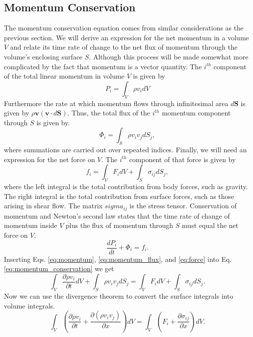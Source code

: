 \documentclass[12pt, letter]{report}
\begin{document}
\subsection{Momentum Conservation}
The momentum conservation equation comes from similar considerations as the previous section. We will derive an expression for the net momentum in a volume $V$ and relate its time rate of change to the net flux of momentum through the volume's enclosing surface $S$. Although this process will be made somewhat more complicated by the fact that momentum is a vector quantity. The $i^{th}$ component of the total linear momentum in volume $V$ is given by
\begin{equation}
\label{eq:momentum}
P_i = \int_V \rho v_i dV
\end{equation}
Furthermore the rate at which momentum flows through infinitesimal area $d\textbf{S}$ is given by $\rho \textbf{v} (\textbf{v} \cdot d\textbf{S})$. Thus, the total flux of the $i^{th}$ momentum component through $S$ is given by.
\begin{equation}
\label{eq:momentum_flux}
\Phi_i = \int_S \rho v_i v_j dS_j,
\end{equation}
where summations are carried out over repeated indices. Finally, we will need an expression for the net force on $V$. The $i^{th}$ component of that force is given by
\begin{equation} 
\label{eq:force}
f_i = \int_V F_i dV + \int_S \sigma_{ij} dS_j,
\end{equation}
where the left integral is the total contribution from body forces, such as gravity. The right integral is the total contribution from surface forces, such as those arising in shear flow. The matrix $sigma_{ij}$ is the stress tensor. Conservation of momentum and Newton's second law states that the time rate of change of momentum inside $V$ plus the flux of momentum through $S$ must equal the net force on $V$.
\begin{equation}
\label{eq:momentum_conservation1}
\frac{d P_i}{d t} + \Phi_i = f_i.
\end{equation}
Inserting Eqs. \ref{eq:momentum}, \ref{eq:momentum_flux}, and \ref{eq:force} into Eq. \ref{eq:momentum_conservation} we get
\begin{equation}
\int_V \frac{\partial \rho v_i}{\partial t} dV + \int_S \rho v_i v_j dS_j = \int_V F_i dV + \int_S \sigma_{ij} dS_j.
\end{equation}
Now we can use the divergence theorem to convert the surface integrals into volume integrals.
\begin{equation}
\int_V \left( \frac{\partial \rho v_i}{\partial t} + \frac{\partial (\rho v_i v_j)}{\partial x} \right) dV = \int_V \left( F_i + \frac{\partial \sigma_{ij}}{\partial x} \right) dV.
\end{equation}
\end{document}
